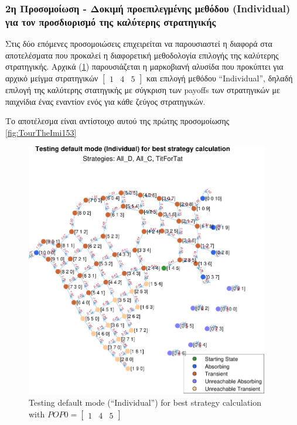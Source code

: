 \documentclass[12pt]{article}
\begin{document}
\subsubsection{2η Προσομοίωση - Δοκιμή προεπιλεγμένης μεθόδου (Individual) για τον προσδιορισμό της καλύτερης στρατηγικής}
Στις δύο επόμενες προσομοιώσεις επιχειρείται να παρουσιαστεί η διαφορά στα αποτελέσματα που προκαλεί η διαφορετική μεθοδολογία επιλογής της καλύτερης στρατηγικής. Αρχικά (\ref{fig:TourTheImiIndividual}) παρουσιάζεται η μαρκοβιανή αλυσίδα που προκύπτει για αρχικό μείγμα στρατηγικών $\begin{bmatrix}1&4&5\end{bmatrix}$ και επιλογή μεθόδου ``Individual'', δηλαδή επιλογή της καλύτερης στατηγικής με σύγκριση των payoffs των στρατηγικών με παιχνίδια ένας εναντίον ενός για κάθε ζεύγος στρατηγικών.

Το αποτέλεσμα είναι αντίστοιχο αυτού της πρώτης προσομοίωσης \ref{fig:TourTheImi153} 
	\begin{figure}[h]
	      \centering
	      \includegraphics[width=0.95\textwidth]{Testing default mode (Individual) for best strategy calculation.pdf}
	      \caption{Testing default mode (``Individual'') for best strategy calculation with $POP0=\begin{bmatrix}1&4&5\end{bmatrix}$}
	      \label{fig:TourTheImiIndividual}
	\end{figure}
\end{document}
